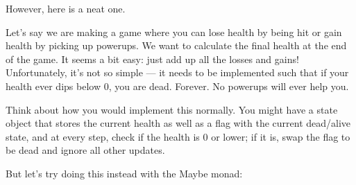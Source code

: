 \documentclass[]{article}
\begin{document}
However, here is a neat one.

Let's say we are making a game where you can lose health by being hit or
gain health by picking up powerups. We want to calculate the final
health at the end of the game. It seems a bit easy: just add up all the
losses and gains! Unfortunately, it's not so simple --- it needs to be
implemented such that if your health ever dips below 0, you are dead.
Forever. No powerups will ever help you.

Think about how you would implement this normally. You might have a
state object that stores the current health as well as a flag with the
current dead/alive state, and at every step, check if the health is 0 or
lower; if it is, swap the flag to be dead and ignore all other updates.

But let's try doing this instead with the Maybe monad:
\end{document}
